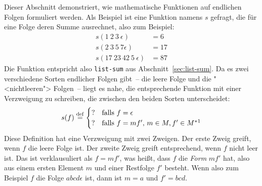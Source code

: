 Dieser Abschnitt demonstriert, wie mathematische Funktionen auf endlichen Folgen
formuliert werden.
Als Beispiel ist eine Funktion namens $s$ gefragt, die für eine Folge deren Summe
ausrechnet, also zum Beispiel:
%
\begin{displaymath}
  \begin{split}
  s(1~2~3~\epsilon) &= 6 \\
  s(2~3~5~7\epsilon) &= 17\\
  s(17~23~42~5~\epsilon) &= 87
\end{split}
\end{displaymath}
% 
Die Funktion entspricht also \texttt{list-sum} aus
Abschnitt~\ref{sec:list-sum}.  Da es zwei verschiedene Sorten endlicher Folgen gibt~-- die leere
Folge und die "<nichtleeren"> Folgen~-- liegt es
nahe, die entsprechende Funktion mit einer Verzweigung zu schreiben,
die zwischen den beiden Sorten unterscheidet:
%
\begin{displaymath}
  s(f) \deq
  \begin{cases}
    ? & \textrm{falls $f = \epsilon$}\\
    ? & \textrm{falls $f = mf'$, $m\in M, f'\in
        M^\ast$}\footnotemark
  \end{cases}
\end{displaymath}
%
Diese Definition hat eine Verzweigung mit zwei Zweigen.  Der erste
Zweig greift, wenn $f$ die leere Folge ist.  Der zweite Zweig greift
entsprechend, wenn $f$ nicht leer ist.  Das ist verklausuliert
als $f =mf'$, was heißt, dass $f$ die \emph{Form} $mf'$ hat, also
aus einem ersten Element $m$ und einer Restfolge $f'$ besteht.  Wenn
also zum Beispiel $f$ die Folge $abcd\epsilon$ ist, dann ist $m = a$
und $f' =bcd$.

